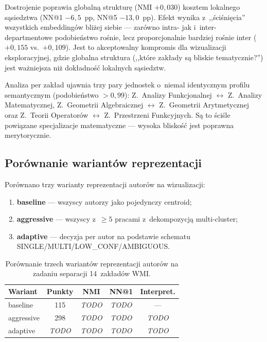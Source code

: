 \documentclass[a4paper,11pt,twocolumn]{article}
\begin{document}
Dostrojenie poprawia globalną strukturę (NMI $+0{,}030$) kosztem
lokalnego sąsiedztwa (NN@1 $-6{,}5$~pp, NN@5 $-13{,}0$~pp). Efekt
wynika z~,,ściśnięcia'' wszystkich embeddingów bliżej siebie --- zarówno
intra- jak i~inter-departmentowe podobieństwo rośnie, lecz
proporcjonalnie bardziej rośnie inter ($+0{,}155$ vs.\ $+0{,}109$).
Jest to akceptowalny kompromis dla wizualizacji eksploracyjnej,
gdzie globalna struktura (,,które zakłady są bliskie tematycznie?'')
jest ważniejsza niż dokładność lokalnych sąsiedztw.

Analiza per zakład ujawnia trzy pary jednostek o~niemal identycznym
profilu semantycznym (podobieństwo $> 0{,}99$): Z.~Analizy Funkcjonalnej
$\leftrightarrow$ Z.~Analizy Matematycznej, Z.~Geometrii Algebraicznej
$\leftrightarrow$ Z.~Geometrii Arytmetycznej oraz Z.~Teorii Operatorów
$\leftrightarrow$ Z.~Przestrzeni Funkcyjnych. Są to ściśle powiązane
specjalizacje matematyczne --- wysoka bliskość jest poprawna merytorycznie.

\subsection{Porównanie wariantów reprezentacji}

Porównano trzy warianty reprezentacji autorów na wizualizacji:
\begin{enumerate}
  \item \textbf{baseline} --- wszyscy autorzy jako pojedynczy centroid;
  \item \textbf{aggressive} --- wszyscy z~$\geq 5$ pracami z~dekompozycją
        multi-cluster;
  \item \textbf{adaptive} --- decyzja per autor na podstawie schematu
        SINGLE/MULTI/LOW\_CONF/AMBIGUOUS.
\end{enumerate}

\begin{table}[t]
\centering
\caption{Porównanie trzech wariantów reprezentacji autorów
na zadaniu separacji 14~zakładów WMI.}
\label{tab:variants}
\small
\begin{tabular}{@{}lcccc@{}}
\toprule
Wariant & Punkty & NMI & NN@1 & Interpret. \\
\midrule
baseline   & 115 & \textit{TODO} & \textit{TODO} & --- \\
aggressive & 298 & \textit{TODO} & \textit{TODO} & \textit{TODO} \\
adaptive   & \textit{TODO} & \textit{TODO} & \textit{TODO} & \textit{TODO} \\
\bottomrule
\end{tabular}
\end{table}
\end{document}
